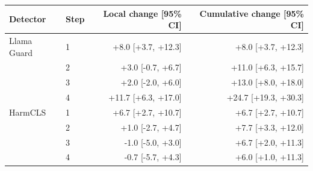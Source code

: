 \begin{tabular}{llrr}
\toprule
Detector & Step & Local change [95\% CI] & Cumulative change [95\% CI] \\
\midrule
Llama Guard & 1 & +8.0 [+3.7, +12.3] & +8.0 [+3.7, +12.3] \\
 & 2 & +3.0 [-0.7, +6.7] & +11.0 [+6.3, +15.7] \\
 & 3 & +2.0 [-2.0, +6.0] & +13.0 [+8.0, +18.0] \\
 & 4 & +11.7 [+6.3, +17.0] & +24.7 [+19.3, +30.3] \\
HarmCLS & 1 & +6.7 [+2.7, +10.7] & +6.7 [+2.7, +10.7] \\
 & 2 & +1.0 [-2.7, +4.7] & +7.7 [+3.3, +12.0] \\
 & 3 & -1.0 [-5.0, +3.0] & +6.7 [+2.0, +11.3] \\
 & 4 & -0.7 [-5.7, +4.3] & +6.0 [+1.0, +11.3] \\
\bottomrule
\end{tabular}
